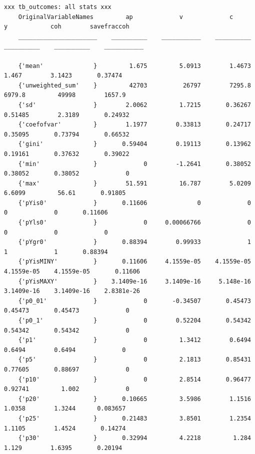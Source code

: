 \documentclass[
]{book}
\begin{document}
\begin{verbatim}
xxx tb_outcomes: all stats xxx
    OriginalVariableNames         ap             v             c             y            coh        savefraccoh
    ______________________    __________    ___________    __________    __________    __________    ___________

    {'mean'              }         1.675         5.0913        1.4673         1.467        3.1423       0.37474 
    {'unweighted_sum'    }         42703          26797        7295.8        6979.8         49998        1657.9 
    {'sd'                }        2.0062         1.7215       0.36267       0.51485        2.3189       0.24932 
    {'coefofvar'         }        1.1977        0.33813       0.24717       0.35095       0.73794       0.66532 
    {'gini'              }       0.59404        0.19113       0.13962       0.19161       0.37632       0.39022 
    {'min'               }             0        -1.2641       0.38052       0.38052       0.38052             0 
    {'max'               }        51.591         16.787        5.0209        6.6099         56.61       0.91805 
    {'pYis0'             }       0.11606              0             0             0             0       0.11606 
    {'pYls0'             }             0     0.00066766             0             0             0             0 
    {'pYgr0'             }       0.88394        0.99933             1             1             1       0.88394 
    {'pYisMINY'          }       0.11606     4.1559e-05    4.1559e-05    4.1559e-05    4.1559e-05       0.11606 
    {'pYisMAXY'          }    3.1409e-16     3.1409e-16     5.148e-16    3.1409e-16    3.1409e-16    2.8381e-26 
    {'p0_01'             }             0       -0.34507       0.45473       0.45473       0.45473             0 
    {'p0_1'              }             0        0.52204       0.54342       0.54342       0.54342             0 
    {'p1'                }             0         1.3412        0.6494        0.6494        0.6494             0 
    {'p5'                }             0         2.1813       0.85431       0.77605       0.88697             0 
    {'p10'               }             0         2.8514       0.96477       0.92741         1.002             0 
    {'p20'               }       0.10665         3.5986        1.1516        1.0358        1.3244      0.083657 
    {'p25'               }       0.21483         3.8501        1.2354        1.1105        1.4524       0.14274 
    {'p30'               }       0.32994         4.2218         1.284         1.129        1.6395       0.20194 

\end{verbatim}
\end{document}
